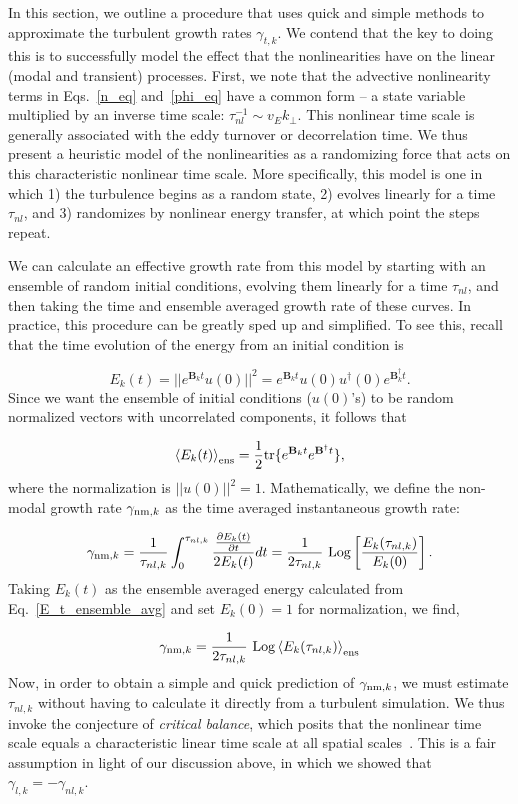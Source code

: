 \documentclass[letter,scriptaddress,twocolumn, prl,showkeys]{revtex4}
\def\beq{\begin{equation}}
\def\eeq{\end{equation}}
\newcommand{\pdiff}[2]{\frac{\partial#1}{\partial#2}}
\begin{document}
In this section, we outline a procedure that uses quick and simple methods to approximate the turbulent growth rates $\gamma_{t,k}$.
We contend that the key to doing this is to successfully model the effect that the nonlinearities have on the linear (modal and transient) processes.
First, we note that the advective nonlinearity terms in Eqs.~\ref{n_eq} and~\ref{phi_eq} have a common form -- a state variable multiplied by an inverse time scale:
$\tau_{nl}^{-1} \sim v_E k_\perp$.
This nonlinear time scale is generally associated with the eddy turnover or decorrelation time. We thus present a heuristic model of the nonlinearities 
as a randomizing force that acts on this characteristic nonlinear time scale. More specifically, this model is one in which 1) the turbulence begins as a random state, 
2) evolves linearly for a time $\tau_{nl}$, and 3) randomizes by nonlinear energy transfer, at which point the steps repeat.

We can calculate an effective growth rate from this model by starting with an ensemble of random initial conditions, evolving them linearly for a time $\tau_{nl}$, and
then taking the time and ensemble averaged growth rate of these curves.
In practice, this procedure can be greatly sped up and simplified. To see this, recall that the time evolution of the energy from an initial condition is

\beq
\label{E_t_from_u0}
E_k(t) = ||e^{\mathbf{B}_k t} u(0)||^2 = e^{\mathbf{B}_k t} u(0) u^{\dagger}(0) e^{\mathbf{B}_k^{\dagger}t}.
\eeq
Since we want the ensemble of initial conditions ($u(0)$'s) to be random normalized vectors with uncorrelated components, it follows that~\cite{camargo1998}

\beq
\label{E_t_ensemble_avg}
\left< E_k(t) \right>_{{\rm{ens}}} = \frac{1}{2} {\rm{tr}} \{ e^{\mathbf{B}_k t} e^{\mathbf{B}^{\dagger}t} \},
\eeq
where the normalization is $||u(0)||^2 = 1$. Mathematically, we define the non-modal growth rate $\gamma_{{\rm{nm}},k}$ as the time averaged instantaneous growth rate:

\beq
\label{gamma_nm_calc}
\gamma_{{\rm{nm}},k} = \frac{1}{\tau_{nl,k}} \int_0^{\tau_{nl,k}} \frac{\pdiff{E_k(t)}{t}}{2 E_k(t)} dt = \frac{1}{2 \tau_{nl,k}} \ {\rm{Log}} \left[ \frac{E_k(\tau_{nl,k})}{E_k(0)}\right].
\eeq
Taking $E_k(t)$ as the ensemble averaged energy calculated from Eq.~\ref{E_t_ensemble_avg} and set $E_k(0) = 1$ for normalization, we find,

\beq
\label{gamma_nm}
\gamma_{{\rm{nm}},k} = \frac{1}{2 \tau_{nl,k}} \ {\rm{Log}} \left<  E_k(\tau_{nl,k}) \right>_{\rm{ens}}
\eeq
Now, in order to obtain a simple and quick prediction of $\gamma_{{\rm{nm}},k}$, we must estimate $\tau_{nl,k}$ without having to calculate it directly from a turbulent simulation. 
We thus invoke the conjecture of \emph{critical balance}, which posits that the nonlinear time scale equals a characteristic linear time scale at all spatial scales~\cite{schekochihin2012}. 
This is a fair assumption in light of our discussion above, in which we showed that $\gamma_{l,k} = - \gamma_{nl,k}$.
\end{document}
